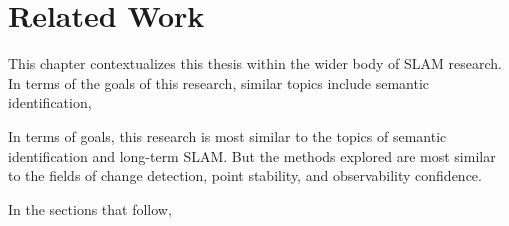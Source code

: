 \section{Related Work}
\label{sec:related_work}

This chapter contextualizes this thesis within the wider body of SLAM research. In terms of the goals of this research, similar topics include semantic identification, 

In terms of goals, this research is most similar to the topics of semantic identification and long-term SLAM. But the methods explored are most similar to the fields of change detection, point stability, and observability confidence.

In the sections that follow,
% 